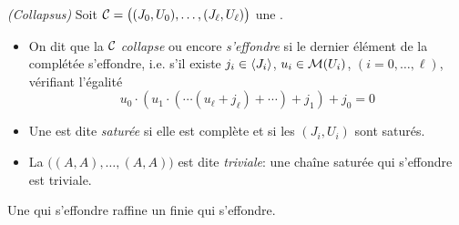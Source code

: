 \begin{definition}{\rm  
\label{defproch2}  {\em (Collapsus)} 
Soit  ${\cal C}=\big((J_0,U_0),\ldots,(J_\ell,U_\ell)\big)$ une \proc.
\begin{itemize}
%
\item  On dit que la \proc ${\cal C}$ {\em collapse} ou encore {\em s'effondre} 
si le dernier élément de la \proc complétée s'effondre, i.e.  s'il existe $j_i\in 
\left\langle{J_i}\right\rangle$, $u_i\in{\cal M}(U_i)$, $(i=0,\ldots,\ell)$, vérifiant 
l'égalité  
\begin{equation} \label {eqdefproch2}
u_0\cdot(u_1\cdot(\cdots(u_\ell+j_\ell)+\cdots)+j_1)+j_0=0 
\end{equation}
%
\item  Une \proc est dite {\em saturée} si elle est complète
et si les \prois $(J_i,U_i)$ sont saturés. 
%
\item  La  \proc 
$\big((A,A),\ldots,(A,A)\big)$ est dite {\em triviale}: une chaîne saturée 
qui s'effondre est triviale. 
%
\end{itemize}
}
\end{definition}

\begin{lemma} \label{lemfinicol2}
Une \proc qui s'effondre raffine un \proc finie qui s'effondre. 
\end{lemma}

